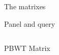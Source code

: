 \documentclass{beamer}
\begin{document}
\begin{frame}{The matrixes}
\begin{block}{Panel and query}
\begin{table}[H]
\begin{tabular}{c|c|c|c|c|c|c|c|c|c|c|c|c|c|c|c|c|c|c|c}
                                                                                                                                                                                                                       \end{tabular}
                                                                                                                                                                                                                                                                                                                                                                                                                              \end{table}
                                                                                                                                                                                                                                                                                                                                                                                                                              \end{block}
                                                                                                                                                                                                                                                                                                                                                                                                                              \begin{block}{PBWT Matrix}
                                                                                                                                                                                                                                                                                                                                                                                                                              \begin{table}[H]
                                                                                                                                                                                                                                                                                                                                                                                                                              \centering
                                                                                                                                                                                                                                                                                                                                                                                                                              \tiny

\end{table}
\end{block}
\end{frame}
\end{document}
